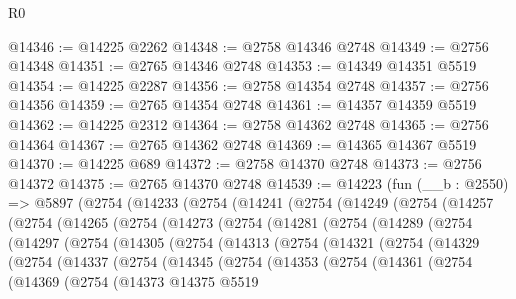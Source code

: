 \begin{lexlean}{R0}
\begin{coremodule}
@14346 := @14225 @2262
@14348 := @2758 @14346 @2748
@14349 := @2756 @14348
@14351 := @2765 @14346 @2748
@14353 := @14349 @14351 @5519
@14354 := @14225 @2287
@14356 := @2758 @14354 @2748
@14357 := @2756 @14356
@14359 := @2765 @14354 @2748
@14361 := @14357 @14359 @5519
@14362 := @14225 @2312
@14364 := @2758 @14362 @2748
@14365 := @2756 @14364
@14367 := @2765 @14362 @2748
@14369 := @14365 @14367 @5519
@14370 := @14225 @689
@14372 := @2758 @14370 @2748
@14373 := @2756 @14372
@14375 := @2765 @14370 @2748
@14539 := @14223
    (fun (__b : @2550) =>
    @5897
      (@2754
        (@14233
          (@2754
            (@14241
              (@2754
                (@14249
                  (@2754
                    (@14257
                      (@2754
                        (@14265
                          (@2754
                            (@14273
                              (@2754
                                (@14281
                                  (@2754
                                    (@14289
                                      (@2754
                                        (@14297
                                          (@2754
                                            (@14305
                                              (@2754
                                                (@14313
                                                  (@2754
                                                    (@14321
                                                      (@2754
                                                        (@14329
                                                          (@2754
                                                            (@14337
                                                              (@2754
                                                                (@14345
                                                                  (@2754
                                                                    (@14353
                                                                      (@2754
                                                                        (@14361
                                                                          (@2754
                                                                            (@14369
                                                                              (@2754
                                                                                (@14373
                                                                                  @14375
                                                                                  @5519

\end{coremodule}
\end{lexlean}
